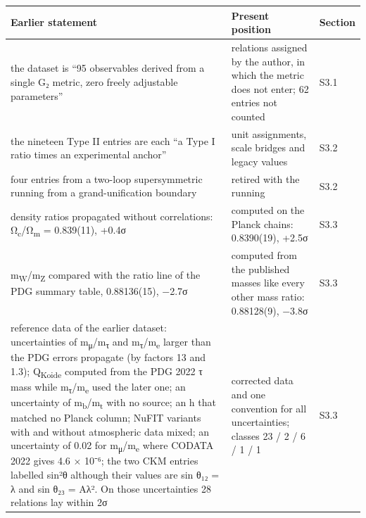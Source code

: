 \documentclass[11pt,a4paper]{article}
\begin{document}
\begin{longtable}[]{@{}
  >{\raggedright\arraybackslash}p{}
  >{\raggedright\arraybackslash}p{}
  >{\raggedright\arraybackslash}p{}@{}}
\toprule\noalign{}
\begin{minipage}[b]{\linewidth}\raggedright
Earlier statement
\end{minipage} & \begin{minipage}[b]{\linewidth}\raggedright
Present position
\end{minipage} & \begin{minipage}[b]{\linewidth}\raggedright
Section
\end{minipage} \\
\midrule\noalign{}
\endhead
\bottomrule\noalign{}
\endlastfoot
the dataset is ``95 observables derived from a single G₂ metric, zero freely adjustable parameters'' & 33 relations assigned by the author, in which the metric does not enter; 62 entries not counted & S3.1 \\
the nineteen Type II entries are each ``a Type I ratio times an experimental anchor'' & unit assignments, scale bridges and legacy values & S3.2 \\
four entries from a two-loop supersymmetric running from a grand-unification boundary & retired with the running & S3.2 \\
density ratios propagated without correlations: Ω\textsubscript{c}/Ω\textsubscript{m} = 0.839(11), +0.4σ & computed on the Planck chains: 0.8390(19), +2.5σ & S3.3 \\
m\textsubscript{W}/m\textsubscript{Z} compared with the ratio line of the PDG summary table, 0.88136(15), −2.7σ & computed from the published masses like every other mass ratio: 0.88128(9), −3.8σ & S3.3 \\
reference data of the earlier dataset: uncertainties of m\textsubscript{μ}/m\textsubscript{τ} and m\textsubscript{τ}/m\textsubscript{e} larger than the PDG errors propagate (by factors 13 and 1.3); Q\textsubscript{Koide} computed from the PDG 2022 τ mass while m\textsubscript{τ}/m\textsubscript{e} used the later one; an uncertainty of m\textsubscript{b}/m\textsubscript{t} with no source; an h that matched no Planck column; NuFIT variants with and without atmospheric data mixed; an uncertainty of 0.02 for m\textsubscript{μ}/m\textsubscript{e} where CODATA 2022 gives 4.6 × 10⁻⁶; the two CKM entries labelled sin²θ although their values are sin θ₁₂ = λ and sin θ₂₃ = Aλ². On those uncertainties 28 relations lay within 2σ & corrected data and one convention for all uncertainties; classes 23 / 2 / 6 / 1 / 1 & S3.3 \\

\end{longtable}
\end{document}

